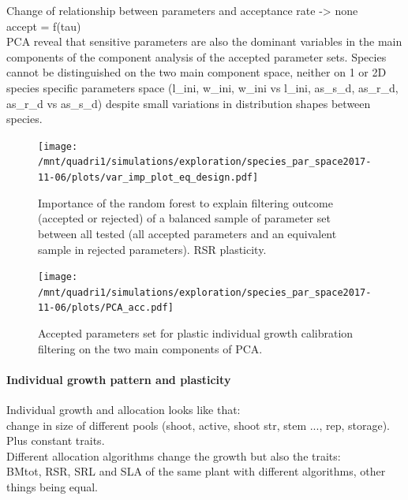 \documentclass[review]{elsarticle}
\begin{document}
Change of relationship between parameters and acceptance rate -> none\\
accept = f(tau)\\

PCA reveal that sensitive parameters are also the dominant variables in the main components of the component analysis of the accepted parameter sets. Species cannot be distinguished on the two main component space, neither on 1 or 2D species specific parameters space (l\_ini, w\_ini, w\_ini vs l\_ini, as\_s\_d, as\_r\_d, as\_r\_d vs as\_s\_d) despite small variations in distribution shapes between species.\\



\begin{figure}
\texttt{[image: /mnt/quadri1/simulations/exploration/species\_par\_space2017-11-06/plots/var\_imp\_plot\_eq\_design.pdf]}
\caption{Importance of the random forest to explain filtering outcome (accepted or rejected) of a balanced sample of parameter set between all tested (all accepted parameters and an equivalent sample in rejected parameters).  RSR plasticity.}
\end{figure}

\begin{figure}
\texttt{[image: /mnt/quadri1/simulations/exploration/species\_par\_space2017-11-06/plots/PCA\_acc.pdf]}
\caption{Accepted parameters set for plastic individual growth calibration filtering  on the two main components of PCA.}
\end{figure}

\paragraph{Individual growth pattern and plasticity}

Individual growth and allocation looks like that:\\
change in size of different pools (shoot, active, shoot str, stem ..., rep, storage). Plus constant traits.\\

Different allocation algorithms change the growth but also the traits:\\
BMtot, RSR, SRL and SLA of the same plant with different algorithms, other things being equal.
\end{document}
